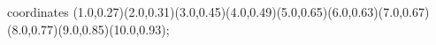 					coordinates { (1.0,0.27)(2.0,0.31)(3.0,0.45)(4.0,0.49)(5.0,0.65)(6.0,0.63)(7.0,0.67)(8.0,0.77)(9.0,0.85)(10.0,0.93)};